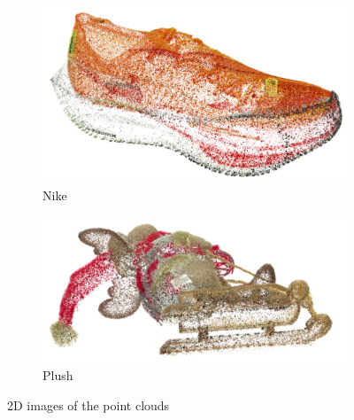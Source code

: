 \documentclass{article}
\begin{document}
\begin{figure}[H]
    \centering
    \begin{subfigure}{0.495\textwidth}
        \includegraphics[width=\textwidth]{nike.png}
        \caption{Nike}
    \end{subfigure}
    \begin{subfigure}{0.495\textwidth}
        \includegraphics[width=\textwidth]{plush.png}
        \caption{Plush}
    \end{subfigure}
    \caption{2D images of the point clouds}
    \label{fig:images}
\end{figure}
\end{document}
